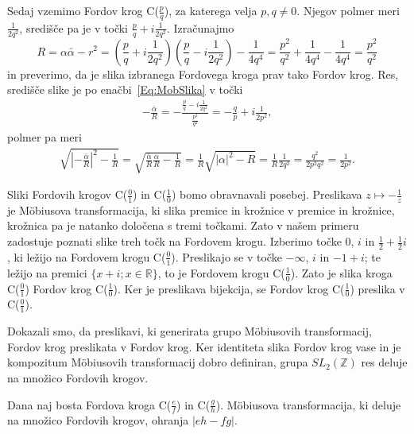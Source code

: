 \documentclass[mat1]{fmfdelo}
\begin{document}
\begin{dokaz}
Sedaj vzemimo Fordov krog C($\frac{p}{q}$), za katerega velja $p,q \neq 0$. Njegov polmer meri $\frac{1}{2q^2}$, središče pa je v točki $\frac{p}{q} +i \frac{1}{2q^2}$.
Izračunajmo
\[ R = \alpha \bar{\alpha} - r^2 = \left(\frac{p}{q} + i\frac{1}{2q^2} \right) \left(\frac{p}{q} - i\frac{1}{2q^2} \right) - \frac{1}{4q^4} 
= \frac{p^2}{q^2} + \frac{1}{4q^4} - \frac{1}{4q^4} = \frac{p^2}{q^2} \]
in preverimo, da je slika izbranega Fordovega kroga prav tako Fordov krog. Res, središče slike je po enačbi~\eqref{Eq:MobSlika} v točki
\begin{align}
-\frac{\bar{\alpha}}{R} = - \frac{\frac{p}{q} - i \frac{1}{2q^2}}{\frac{p^2}{q^2}} = - \frac{q}{p} + i \frac{1}{2p^2},
\end{align}
polmer pa meri
\begin{align}
\sqrt{ \left| - \frac{\bar{\alpha}}{R} \right|^2 - \frac{1}{R} } = \sqrt{ \frac{\bar{\alpha}}{R} \frac{\alpha}{R} - \frac{1}{R} } 
= \frac{1}{R} \sqrt{|\alpha|^2 - R} =  \frac{1}{R} \frac{1}{2q^2} = \frac{q^2}{2p^2 q^2} = \frac{1}{2p^2}.
\end{align}
%

Sliki Fordovih krogov C($\frac{0}{1}$) in C($\frac{1}{0}$) bomo obravnavali posebej. Preslikava $z \mapsto -\frac{1}{z}$ je M\"obiusova transformacija, ki slika premice in krožnice v premice in krožnice, krožnica pa je natanko določena s tremi točkami. Zato v našem primeru zadostuje poznati slike treh točk na Fordovem krogu. Izberimo točke $0$, $i$ in $\frac{1}{2} + \frac{1}{2} i$, ki ležijo na Fordovem krogu C($\frac{0}{1}$). Preslikajo se v točke $-\infty$, $i$ in $-1+i$; te ležijo na premici $\{x+i; x \in \mathbb{R} \}$, to je Fordovem krogu C($\frac{1}{0}$). Zato je slika kroga C($\frac{0}{1}$) Fordov krog C($\frac{1}{0}$). Ker je preslikava bijekcija, se Fordov krog C($\frac{1}{0}$) preslika v C($\frac{0}{1}$).

%
Dokazali smo, da preslikavi, ki generirata grupo M\"{o}biusovih transformacij, Fordov krog preslikata v Fordov krog. Ker identiteta slika Fordov krog vase in je kompozitum M\"{o}biusovih transformacij dobro definiran, grupa ${SL}_{2}(\mathbb{Z})$ res deluje na množico Fordovih krogov.
\end{dokaz}

\begin{lema}
Dana naj bosta Fordova kroga C($\frac{e}{f}$) in C($\frac{g}{h}$). M\"{o}biusova transformacija, ki deluje na množico Fordovih krogov, ohranja $|eh-fg|$.
\end{lema}
\end{document}
